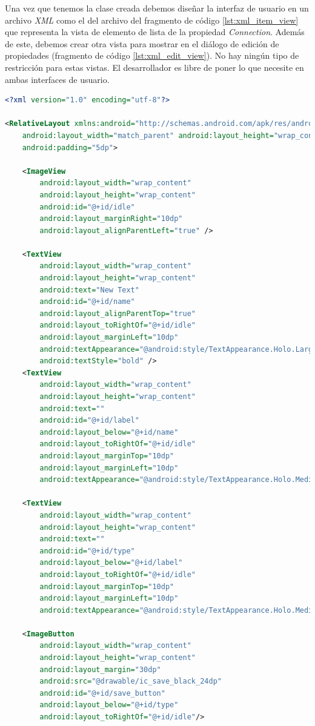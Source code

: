 \bigskip
Una vez que tenemos la clase creada debemos diseñar la interfaz de usuario en un archivo \textit{XML} como el del archivo del fragmento de código \ref{lst:xml_item_view} que representa la vista de elemento de lista de la propiedad \textit{Connection}. Además de este, debemos crear otra vista para mostrar en el diálogo de edición de propiedades (fragmento de código \ref{lst:xml_edit_view}). No hay ningún tipo de restricción para estas vistas. El desarrollador es libre de poner lo que necesite en ambas interfaces de usuario.

\begin{lstlisting}[language=XML,caption={Vista item XML de una propiedad},label={lst:xml_item_view}]
<?xml version="1.0" encoding="utf-8"?>

<RelativeLayout xmlns:android="http://schemas.android.com/apk/res/android"
    android:layout_width="match_parent" android:layout_height="wrap_content"
    android:padding="5dp">

    <ImageView
        android:layout_width="wrap_content"
        android:layout_height="wrap_content"
        android:id="@+id/idle"
        android:layout_marginRight="10dp"
        android:layout_alignParentLeft="true" />

    <TextView
        android:layout_width="wrap_content"
        android:layout_height="wrap_content"
        android:text="New Text"
        android:id="@+id/name"
        android:layout_alignParentTop="true"
        android:layout_toRightOf="@+id/idle"
        android:layout_marginLeft="10dp"
        android:textAppearance="@android:style/TextAppearance.Holo.Large"
        android:textStyle="bold" />
    <TextView
        android:layout_width="wrap_content"
        android:layout_height="wrap_content"
        android:text=""
        android:id="@+id/label"
        android:layout_below="@+id/name"
        android:layout_toRightOf="@+id/idle"
        android:layout_marginTop="10dp"
        android:layout_marginLeft="10dp"
        android:textAppearance="@android:style/TextAppearance.Holo.Medium" />

    <TextView
        android:layout_width="wrap_content"
        android:layout_height="wrap_content"
        android:text=""
        android:id="@+id/type"
        android:layout_below="@+id/label"
        android:layout_toRightOf="@+id/idle"
        android:layout_marginTop="10dp"
        android:layout_marginLeft="10dp"
        android:textAppearance="@android:style/TextAppearance.Holo.Medium" />

    <ImageButton
        android:layout_width="wrap_content"
        android:layout_height="wrap_content"
        android:layout_margin="30dp"
        android:src="@drawable/ic_save_black_24dp"
        android:id="@+id/save_button"
        android:layout_below="@+id/type"
        android:layout_toRightOf="@+id/idle"/>


\end{lstlisting}
